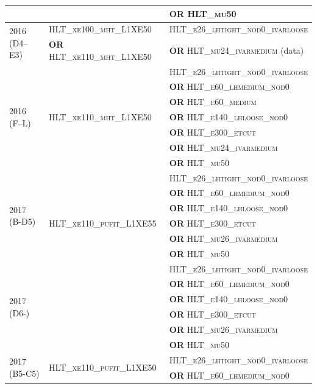 \begin{table}[hbtp]
{{\begin{tabular}{l l l}
& & \textbf{OR} \textsc{HLT\_mu50} \\
\midrule
\multirow{2}{*}{2016 (D4--E3)} & \textsc{HLT\_xe100\_mht\_L1XE50} & \textsc{HLT\_e26\_lhtight\_nod0\_ivarloose} \\
& \textbf{OR} \textsc{HLT\_xe110\_mht\_L1XE50} & \textbf{OR} \textsc{HLT\_mu24\_ivarmedium} (data) \\
\midrule
\multirow{7}{*}{2016 (F--L)} & \multirow{7}{*}{\textsc{HLT\_xe110\_mht\_L1XE50}} & \textsc{HLT\_e26\_lhtight\_nod0\_ivarloose} \\
& & \textbf{OR} \textsc{HLT\_e60\_lhmedium\_nod0} \\
& & \textbf{OR} \textsc{HLT\_e60\_medium} \\
& & \textbf{OR} \textsc{HLT\_e140\_lhloose\_nod0} \\
& & \textbf{OR} \textsc{HLT\_e300\_etcut} \\
& & \textbf{OR} \textsc{HLT\_mu24\_ivarmedium} \\
& & \textbf{OR} \textsc{HLT\_mu50} \\
\midrule
\multirow{6}{*}{2017 (B-D5)} & \multirow{7}{*}{\textsc{HLT\_xe110\_pufit\_L1XE55}} & \textsc{HLT\_e26\_lhtight\_nod0\_ivarloose} \\
& & \textbf{OR} \textsc{HLT\_e60\_lhmedium\_nod0} \\
& & \textbf{OR} \textsc{HLT\_e140\_lhloose\_nod0} \\
& & \textbf{OR} \textsc{HLT\_e300\_etcut} \\
& & \textbf{OR} \textsc{HLT\_mu26\_ivarmedium} \\
& & \textbf{OR} \textsc{HLT\_mu50} \\
\midrule
\multirow{6}{*}{2017 (D6-)} & \multirow{7}{*}{\textsc{HLT\_xe110\_pufit\_L1XE50}} & \textsc{HLT\_e26\_lhtight\_nod0\_ivarloose} \\
& & \textbf{OR} \textsc{HLT\_e60\_lhmedium\_nod0} \\
& & \textbf{OR} \textsc{HLT\_e140\_lhloose\_nod0} \\
& & \textbf{OR} \textsc{HLT\_e300\_etcut} \\
& & \textbf{OR} \textsc{HLT\_mu26\_ivarmedium} \\
& & \textbf{OR} \textsc{HLT\_mu50} \\
\midrule
\multirow{6}{*}{2017 (B5-C5)} & \multirow{7}{*}{\textsc{HLT\_xe110\_pufit\_L1XE50}} & \textsc{HLT\_e26\_lhtight\_nod0\_ivarloose} \\
& & \textbf{OR} \textsc{HLT\_e60\_lhmedium\_nod0} \\

\end{tabular}}}
\end{table}
